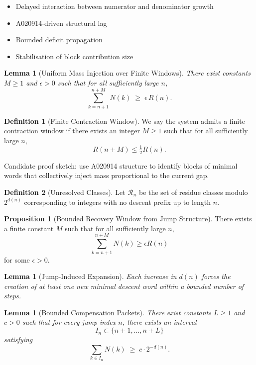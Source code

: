 \documentclass[12pt, oneside]{article}
\numberwithin{equation}{section}
\theoremstyle{definition}
\newtheorem{definition}{Definition}[section]
\newtheorem{proposition}{Proposition}[section]
\theoremstyle{plain}
\newtheorem{lemma}[theorem]{Lemma}
\theoremstyle{remark}
\begin{document}
\begin{itemize}
    \item Delayed interaction between numerator and denominator growth
    \item A020914-driven structural lag
    \item Bounded deficit propagation
    \item Stabilisation of block contribution size
\end{itemize}

\begin{lemma}[Uniform Mass Injection over Finite Windows]
\label{lem:mass-injection}
There exist constants $M \ge 1$ and $\epsilon > 0$ such that for all sufficiently large $n$,
\[
\sum_{k=n+1}^{n+M} N(k) \;\ge\; \epsilon \, R(n).
\]
\end{lemma}

\begin{definition}[Finite Contraction Window]
We say the system admits a finite contraction window if there exists
an integer $M \ge 1$ such that for all sufficiently large $n$,
\[
R(n+M) \le \tfrac{1}{2} R(n).
\]
\end{definition}

Candidate proof sketch: 
use A020914 structure to identify blocks of minimal
words that collectively inject mass proportional to the current gap.
\begin{definition}[Unresolved Classes]
Let $\mathcal{R}_n$ be the set of residue classes modulo $2^{d(n)}$
corresponding to integers with no descent prefix up to length $n$.
\end{definition}

\begin{proposition}[Bounded Recovery Window from Jump Structure]
There exists a finite constant $M$ such that for all sufficiently large $n$,
\[
\sum_{k=n+1}^{n+M} N(k) \ge \epsilon R(n)
\]
for some $\epsilon > 0$.
\end{proposition}

\begin{lemma}[Jump-Induced Expansion]
Each increase in $d(n)$ forces the creation of at least one new
minimal descent word within a bounded number of steps.
\end{lemma}

\begin{lemma}[Bounded Compensation Packets]
\label{lem:compensation-packets}
There exist constants $L \ge 1$ and $c > 0$ such that
for every jump index $n$, there exists an interval
\[
I_n \subset \{n+1, \dots, n+L\}
\]
satisfying
\[
\sum_{k \in I_n} N(k) \;\ge\; c \cdot 2^{-d(n)}.
\]
\end{lemma}
\end{document}
